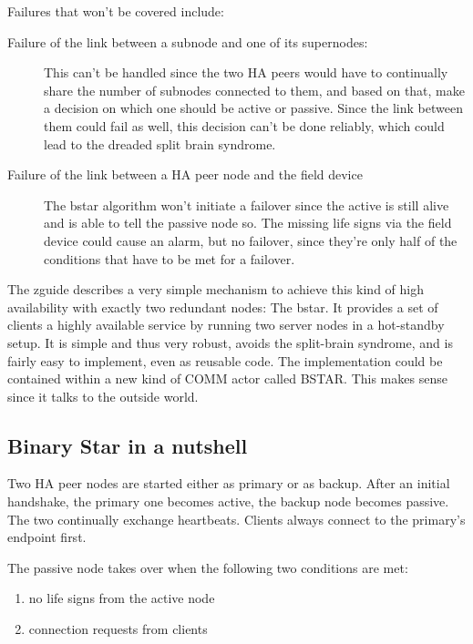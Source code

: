 Failures that won't be covered include:
\begin{description}
	\item [Failure of the link between a subnode and one of its supernodes:]

		This can't be handled since the two HA peers would have to
		continually share the number of subnodes connected to them, and
		based on that, make a decision on which one should be active or
		passive. Since the link between them could fail as well, this
		decision can't be done reliably, which could lead to the
		dreaded split brain syndrome.

	\item [Failure of the link between a HA peer node and the field device]
		The \gls{bstar} algorithm won't initiate a failover since the
		active is still alive and is able to tell the passive node so.
		The missing life signs via the field device could cause an alarm, but no
		failover, since they're only half of the conditions that have
		to be met for a failover.
\end{description}

The \gls{zguide} describes a very simple mechanism to achieve this kind of high
availability with exactly two redundant nodes: The \gls{bstar}. It
provides a set of clients a highly available service by running two server
nodes in a hot-standby setup. It is simple and thus very robust, avoids the
split-brain syndrome, and is fairly easy to implement, even as reusable
code. The implementation could be contained within a new kind of COMM actor
called BSTAR. This makes sense since it talks to the outside world.


\subsection{Binary Star in a nutshell}
Two HA peer nodes are started either as primary or as backup. After an initial
handshake, the primary one becomes active, the backup node becomes passive. The
two continually exchange heartbeats. Clients always connect to the primary's endpoint first.

The passive node takes over when the following two conditions are met:

\begin{enumerate}
\item no life signs from the active node
\item connection requests from clients
\end{enumerate}

